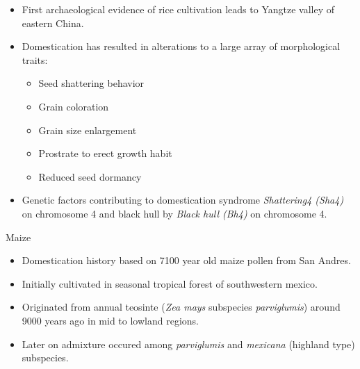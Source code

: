 \documentclass[
  ignorenonframetext,
  aspectratio=169]{beamer}
\providecommand{\tightlist}{%
  \setlength{\itemsep}{0pt}\setlength{\parskip}{0pt}}
\begin{document}
\begin{frame}{}
\protect\hypertarget{section-15}{}
\begin{itemize}
\tightlist
\item
  First archaeological evidence of rice cultivation leads to Yangtze
  valley of eastern China.
\item
  Domestication has resulted in alterations to a large array of
  morphological traits:

  \begin{itemize}
  \tightlist
  \item
    Seed shattering behavior
  \item
    Grain coloration
  \item
    Grain size enlargement
  \item
    Prostrate to erect growth habit
  \item
    Reduced seed dormancy
  \end{itemize}
\item
  Genetic factors contributing to domestication syndrome
  \emph{Shattering4 (Sha4)} on chromosome 4 and black hull by
  \emph{Black hull (Bh4)} on chromosome 4.
\end{itemize}
\end{frame}

\begin{frame}{Maize}
\protect\hypertarget{maize}{}
\begin{itemize}
\tightlist
\item
  Domestication history based on 7100 year old maize pollen from San
  Andres.
\item
  Initially cultivated in seasonal tropical forest of southwestern
  mexico.
\item
  Originated from annual teosinte (\emph{Zea mays} subspecies
  \emph{parviglumis}) around 9000 years ago in mid to lowland regions.
\item
  Later on admixture occured among \emph{parviglumis} and
  \emph{mexicana} (highland type) subspecies.
\end{itemize}
\end{frame}
\end{document}

